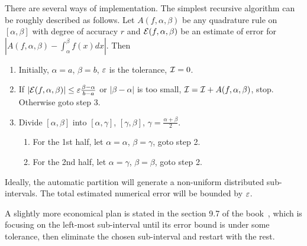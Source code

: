 There are several ways of implementation. The simplest recursive algorithm can be roughly described as follows. Let $A(f, \alpha, \beta)$ be any quadrature rule on $[\alpha, \beta]$ with degree of accuracy $r$ and $\mathcal E(f, \alpha, \beta)$ be an estimate of error for $|A(f, \alpha, \beta)-\int_{\alpha}^{\beta} f(x) dx|$. Then 
\begin{enumerate}
    \item Initially, $\alpha = a$, $\beta = b$, $\varepsilon$ is the tolerance, $\mathcal I = 0$.
    \item If $|\mathcal E(f, \alpha, \beta)| \le \varepsilon\frac{\beta - \alpha}{b - a}$ or $|\beta - \alpha|$ is too small, $\mathcal I =\mathcal I+A(f,\alpha, \beta)$, stop. Otherwise goto step 3.
    \item Divide $[\alpha, \beta]$ into $[\alpha, \gamma]$, $[\gamma, \beta]$, $\gamma = \frac{\alpha + \beta}{2}$. 
        \begin{enumerate}
            \item For the 1st half, let $\alpha = \alpha$, $\beta = \gamma$, goto step 2. 
            \item For the 2nd half, let $\alpha = \gamma$, $\beta = \beta$, goto step 2. 
        \end{enumerate}
\end{enumerate}
Ideally, the automatic partition will generate a non-uniform distributed sub-intervals. The total estimated numerical error will be bounded by $\varepsilon$. 

A slightly more economical plan is stated in the section 9.7 of the book~\cite{quarteroni2010numerical}, which is focusing on the left-most sub-interval until its error bound is under  some tolerance, then eliminate the chosen sub-interval and restart with the rest. 

